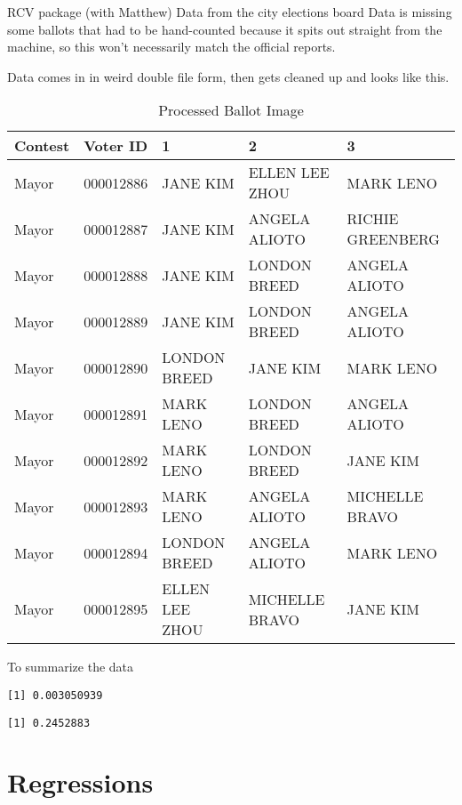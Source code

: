 \documentclass[12pt,twoside]{reedthesis}
\theoremstyle{definition}
\theoremstyle{definition}
\theoremstyle{definition}
\theoremstyle{remark}
\begin{document}
RCV package (with Matthew) Data from the city elections board Data is
missing some ballots that had to be hand-counted because it spits out
straight from the machine, so this won't necessarily match the official
reports.

Data comes in in weird double file form, then gets cleaned up and looks
like this.
\begin{longtable}[t]{lllll}
\caption{\label{tab:unnamed-chunk-10}Processed Ballot Image}\\
\toprule
Contest & Voter ID & 1 & 2 & 3\\
\midrule
Mayor & 000012886 & JANE KIM & ELLEN LEE ZHOU & MARK LENO\\
Mayor & 000012887 & JANE KIM & ANGELA ALIOTO & RICHIE GREENBERG\\
Mayor & 000012888 & JANE KIM & LONDON BREED & ANGELA ALIOTO\\
Mayor & 000012889 & JANE KIM & LONDON BREED & ANGELA ALIOTO\\
Mayor & 000012890 & LONDON BREED & JANE KIM & MARK LENO\\
\addlinespace
Mayor & 000012891 & MARK LENO & LONDON BREED & ANGELA ALIOTO\\
Mayor & 000012892 & MARK LENO & LONDON BREED & JANE KIM\\
Mayor & 000012893 & MARK LENO & ANGELA ALIOTO & MICHELLE BRAVO\\
Mayor & 000012894 & LONDON BREED & ANGELA ALIOTO & MARK LENO\\
Mayor & 000012895 & ELLEN LEE ZHOU & MICHELLE BRAVO & JANE KIM\\
\bottomrule
\end{longtable}
To summarize the data
\begin{verbatim}
[1] 0.003050939
\end{verbatim}
\begin{verbatim}
[1] 0.2452883
\end{verbatim}
\hypertarget{regressions}{%
\section{Regressions}\label{regressions}}
\end{document}
